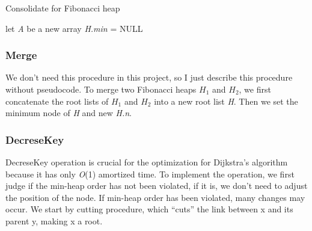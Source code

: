 \documentclass[12pt]{article}
\begin{document}
    \begin{algorithm}
        \caption{Consolidate for Fibonacci heap}
        \LinesNumbered
        let \emph{A} be a new array\;
        \emph{H.min} = NULL\;
    \end{algorithm}

    \subsubsection{Merge}
    We don't need this procedure in this project, so I just describe
    this procedure without pseudocode. To merge two Fibonacci heaps $H_{1}$ and $H_{2}$, 
    we first concatenate the root lists of $H_{1}$ and $H_{2}$ into a new root list \emph{H}. 
    Then we set the minimum node of \emph{H} and new \emph{H.n}.

    \subsubsection{DecreseKey}
    DecreseKey operation is crucial for the optimization for Dijkstra's algorithm
    because it has only \emph{O}(1) amortized time. To implement the operation, 
    we first judge if the min-heap order has not been violated, if it is, we don't need to adjust the position of the node.
    If min-heap order has been violated, many changes may occur. We start by
    cutting procedure, which “cuts” the link between x and its parent y,
    making x a root.
\end{document}
